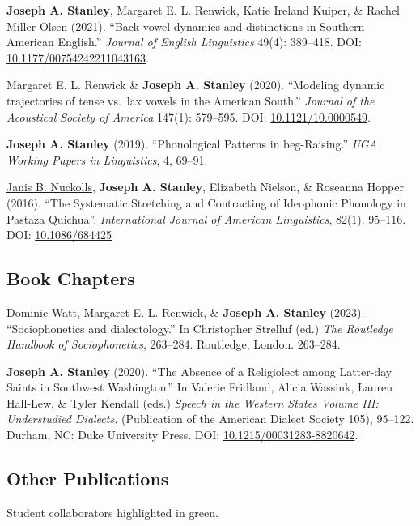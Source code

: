 \documentclass[
]{article}
\begin{document}
\textbf{Joseph A. Stanley}, Margaret E. L. Renwick, Katie Ireland
Kuiper, \& Rachel Miller Olsen (2021). ``Back vowel dynamics and
distinctions in Southern American English.'' \emph{Journal of English
Linguistics} 49(4): 389--418. DOI:
\href{https://doi.org/10.1177/00754242211043163}{10.1177/00754242211043163}.

Margaret E. L. Renwick \& \textbf{Joseph A. Stanley} (2020). ``Modeling
dynamic trajectories of tense vs.~lax vowels in the American South.''
\emph{Journal of the Acoustical Society of America} 147(1): 579--595.
DOI:
\href{https://asa.scitation.org/doi/10.1121/10.0000549}{10.1121/10.0000549}.

\textbf{Joseph A. Stanley} (2019). ``Phonological Patterns in
beg-Raising.'' \emph{UGA Working Papers in Linguistics}, 4, 69--91.

\href{https://hum.byu.edu/directory/janis-nuckolls}{Janis B. Nuckolls},
\textbf{Joseph A. Stanley}, Elizabeth Nielson, \& Roseanna Hopper
(2016). ``The Systematic Stretching and Contracting of Ideophonic
Phonology in Pastaza Quichua''. \emph{International Journal of American
Linguistics}, 82(1). 95--116. DOI:
\href{http://dx.doi.org/10.1086/684425}{10.1086/684425}

\hypertarget{book-chapters}{%
\subsection{Book Chapters}\label{book-chapters}}

Dominic Watt, Margaret E. L. Renwick, \& \textbf{Joseph A. Stanley}
(2023). ``Sociophonetics and dialectology.'' In Christopher Strelluf
(ed.) \emph{The Routledge Handbook of Sociophonetics}, 263--284.
Routledge, London. 263--284.

\textbf{Joseph A. Stanley} (2020). ``The Absence of a Religiolect among
Latter-day Saints in Southwest Washington.'' In Valerie Fridland, Alicia
Wassink, Lauren Hall-Lew, \& Tyler Kendall (eds.) \emph{Speech in the
Western States Volume III: Understudied Dialects.} (Publication of the
American Dialect Society 105), 95--122. Durham, NC: Duke University
Press. DOI:
\href{https://doi.org/10.1215/00031283-8820642}{10.1215/00031283-8820642}.

\hypertarget{other-publications}{%
\subsection{Other Publications}\label{other-publications}}

\begin{tcolorbox}[enhanced jigsaw, opacityback=0, colback=white, opacitybacktitle=0.6, bottomrule=.15mm, leftrule=.75mm, toprule=.15mm, arc=.35mm, toptitle=1mm, colframe=quarto-callout-note-color-frame, breakable, titlerule=0mm, coltitle=black, colbacktitle=quarto-callout-note-color!10!white, left=2mm, bottomtitle=1mm, title=\textcolor{quarto-callout-note-color}{\faInfo}\hspace{0.5em}{Note}, rightrule=.15mm]

Student collaborators highlighted in {green}.

\end{tcolorbox}
\end{document}
